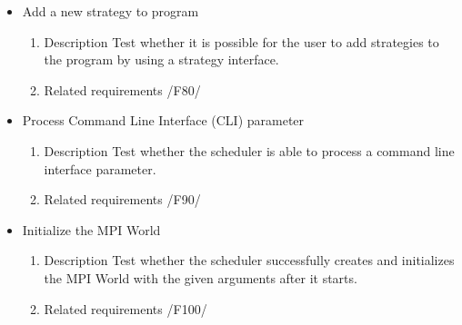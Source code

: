 {\begin{itemize}
\begin{enumerate}
\begin{itemize}
							\end{itemize}
							
						\item Related requirements\newline
 							  /F30/, /F40/, /F50/, /F60/		
				\end{enumerate}	
				
				
				
				\item Add a new strategy to program
				\begin{enumerate}
					\item Description\newline
Test whether it is possible for the user to add strategies to the program by using a strategy interface.
					\item Related requirements\newline
						/F80/
				\end{enumerate}
					
				
				\item Process Command Line Interface (CLI) parameter 		
					\begin{enumerate}
						\item Description\newline
Test whether the scheduler is able to process a command line interface parameter.
						\item Related requirements\newline
 							  /F90/		
				\end{enumerate}	
				
				\item Initialize the MPI World 
				\begin{enumerate}
						\item Description\newline
Test whether the scheduler successfully creates and initializes the MPI World with the given arguments after it starts.
						\item Related requirements\newline
 							  /F100/		
				\end{enumerate}




\end{itemize}}
